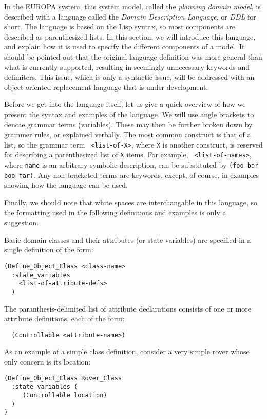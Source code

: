 In the EUROPA system, this system model, called the {\em planning
domain model}, is described with a language called the {\em Domain
Description Language}, or {\em DDL} for short.  The language is based
on the Lisp syntax, so most components are described as parenthesized
lists.  In this section, we will introduce this language, and explain
how it is used to specify the different components of a model.  It
should be pointed out that the original language definition was more
general than what is currently supported, resulting in seemingly
unnecessary keywords and delimiters.  This issue, which is only a
syntactic issue, will be addressed with an object-oriented replacement
language that is under development.

Before we get into the language itself, let us give a quick overview
of how we present the syntax and examples of the language.  We will
use angle brackets to denote grammar terms (variables).  These may
then be further broken down by grammer rules, or explained verbally.
The most common construct is that of a list, so the grammar term {\tt
<list-of-X>}, where {\tt X} is another construct, is reserved for
describing a parenthesized list of {\tt X} items.  For example, {\tt
<list-of-names>}, where {\tt name} is an arbitrary symbolic
description, can be substituted by {\tt (foo bar boo far)}.  Any
non-bracketed terms are keywords, except, of course, in examples
showing how the language can be used.


Finally, we should note that white spaces are interchangable in this
language, so the formatting used in the following definitions and
examples is only a suggestion.



Basic domain classes and their attributes (or state variables) are
specified in a single definition of the form:
  \begin{verbatim}
(Define_Object_Class <class-name>
  :state_variables
    <list-of-attribute-defs>
  )  \end{verbatim}
  The paranthesis-delimited list of attribute declarations consists of
one or more attribute definitions, each of the form:
  \begin{verbatim}
  (Controllable <attribute-name>) \end{verbatim}

As an example of a simple class definition, consider a very simple
rover whose only concern is its location:
  \begin{verbatim}
(Define_Object_Class Rover_Class
  :state_variables (
     (Controllable location)
  )
)  \end{verbatim}

